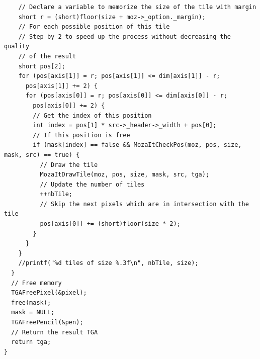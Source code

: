 \documentclass[12pt, a4paper]{article}
\begin{document}
\begin{scriptsize}
\begin{ttfamily}
\begin{lstlisting}
    // Declare a variable to memorize the size of the tile with margin
    short r = (short)floor(size + moz->_option._margin);
    // For each possible position of this tile
    // Step by 2 to speed up the process without decreasing the quality
    // of the result
    short pos[2];
    for (pos[axis[1]] = r; pos[axis[1]] <= dim[axis[1]] - r; 
      pos[axis[1]] += 2) { 
      for (pos[axis[0]] = r; pos[axis[0]] <= dim[axis[0]] - r; 
        pos[axis[0]] += 2) { 
        // Get the index of this position
        int index = pos[1] * src->_header->_width + pos[0];
        // If this position is free
        if (mask[index] == false && MozaItCheckPos(moz, pos, size, mask, src) == true) {
          // Draw the tile
          MozaItDrawTile(moz, pos, size, mask, src, tga);
          // Update the number of tiles
          ++nbTile;
          // Skip the next pixels which are in intersection with the tile
          pos[axis[0]] += (short)floor(size * 2);
        }
      }
    }
    //printf("%d tiles of size %.3f\n", nbTile, size);
  }
  // Free memory
  TGAFreePixel(&pixel);
  free(mask);
  mask = NULL;
  TGAFreePencil(&pen);
  // Return the result TGA
  return tga;
}


\end{lstlisting}
\end{ttfamily}
\end{scriptsize}
\end{document}
